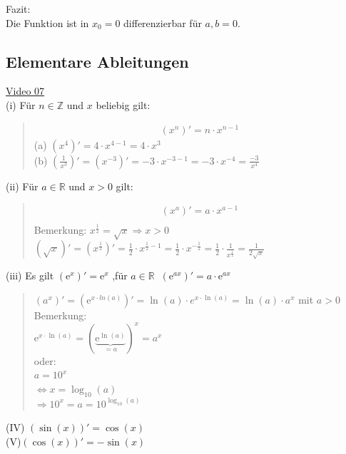 Fazit:\\
Die Funktion ist in $ x_0=0 $ differenzierbar für $ a,b=0 $.\\
\newpage
\noindent
\subsection{Elementare Ableitungen}
\href{https://youtu.be/V_SmItBir8U}{Video 07}\\
(i) Für $n\in \mathbb{Z}  $ und $ x $ beliebig gilt:\\
\begin{quote}
	\begin{align*}
	(x^n)'=n\cdot x^{n-1}
	\end{align*}
	(a) $ (x^4)'=4\cdot x^{4-1}=4\cdot x^3 $\\
	(b) $ (\frac{1}{x^3})'=(x^{-3})'=-3\cdot x^{-3-1}=-3\cdot x^{-4}=\frac{-3}{x^4} $\\
\end{quote}
(ii) Für $ a\in\mathbb{R} $ und $ x>0 $ gilt:\\
\begin{quote}
	\begin{align*}
	(x^{a})'=a\cdot x^{a-1}\\
	\end{align*}
	Bemerkung: $ x^{\frac{1}{2}}=\sqrt{x}\Rightarrow x>0 $\vspace*{4mm}\\
	 $ (\sqrt{x})'=(x^{\frac{1}{2}})' = \frac{1}{2}\cdot x^{\frac{1}{2}-1}=\frac{1}{2}\cdot x^{-\frac{1}{2}}=\frac{1}{2}\cdot \frac{1}{x^{\frac{1}{2}}}=\frac{1}{2\sqrt{x}}$\\
\end{quote}
(iii) Es gilt $ (\mathrm{e}^x)' =\mathrm{e}^x$ ,für  $ a\in \mathbb{R}\;\;(\mathrm{e}^{ax})'=a\cdot \mathrm{e}^{ax} $ \\
\begin{quote}
  $ (a^x)'=(\mathrm{e}^{x\cdot ln(a)})'=\ln(a)\cdot e^{x\cdot \ln(a)}=\ln(a)\cdot a^x$ mit $ a>0 $\\
	Bemerkung:\\
	$ \mathrm{e}^{x\cdot \ln(a)}=(\underbrace {\mathrm{e}^{\ln(a)}}_{=a})^x=a^x $\\
	oder:\\
	$a=10^x$\\
	$ \Leftrightarrow x=\log_{10}(a) $\\
	$\Rightarrow 10^x=a=10^{\log_{10}(a)}$
\end{quote}
(IV) $ (\sin(x))'=\cos(x) $\\
(V)\;\;$ (\cos(x))'=-\sin(x) $\\
